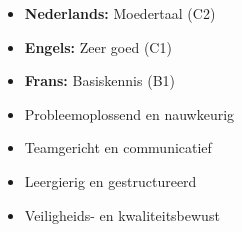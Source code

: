 \tweekolommensectie
{
    \vspace{1em}
    \begin{itemize}
        \item \textbf{Nederlands:} Moedertaal (C2)
        \item \textbf{Engels:} Zeer goed (C1)
        \item \textbf{Frans:} Basiskennis (B1)
    \end{itemize}
}
{
    \vspace{1em}
    \begin{itemize}
        \item Probleemoplossend en nauwkeurig
        \item Teamgericht en communicatief
        \item Leergierig en gestructureerd
        \item Veiligheids- en kwaliteitsbewust
    \end{itemize}}
